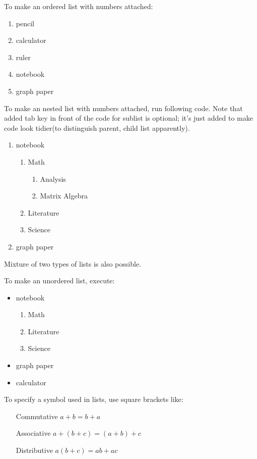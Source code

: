 \documentclass[11pt]{article}
\begin{document}
To make an ordered list with numbers attached:
\begin{enumerate}
\item pencil
\item calculator
\item ruler
\item notebook
\item graph paper
\end{enumerate}

To make an nested list with numbers attached, run following code. Note that added
tab key in front of the code for sublist is optional; it's just added to make code
look tidier(to distinguish parent, child list apparently).
\begin{enumerate}
\item notebook
	\begin{enumerate}
	\item Math
		\begin{enumerate}
		\item Analysis
		\item Matrix Algebra
		\end{enumerate}
	\item Literature
	\item Science
	\end{enumerate}
\item graph paper
\end{enumerate}
Mixture of two types of lists is also possible.

To make an unordered list, execute:
\begin{itemize}
\item notebook
	\begin{enumerate}
	\item Math
	\item Literature
	\item Science
	\end{enumerate}
\item graph paper
\item calculator
\end{itemize}

To specify a symbol used in lists, use square brackets like:
\begin{enumerate}
\item[Commutative] $a+b=b+a$
\item[Associative] $a+(b+c)=(a+b)+c$
\item[Distributive] $a(b+c)=ab+ac$
\end{enumerate}
\end{document}
